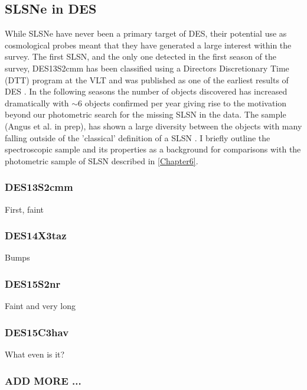 \subsection{SLSNe in DES}
\label{sec:DES_SLSN}
While SLSNe have never been a primary target of DES, their potential use as cosmological probes \citep{Inserra2014} meant that they have generated a large interest within the survey. The first SLSN, and the only one detected in the first season of the survey, DES13S2cmm has been classified using a Directors Discretionary Time (DTT) program at the VLT and was published as one of the earliest results of DES \cite{Papadopoulos2015}. In the following seasons the number of objects discovered has increased dramatically with $\sim$6 objects confirmed per year giving rise to the motivation beyond our photometric search for the missing SLSN in the data. The sample (Angus et al. in prep), has shown a large diversity between the objects with many falling outside of the 'classical' definition of a SLSN \citep{Inserra2018}. I briefly outline the spectroscopic sample and its properties as a background for comparisons with the photometric sample of SLSN described in \cref{Chapter6}.   

\subsubsection{DES13S2cmm}
First, faint

\subsubsection{DES14X3taz}
Bumps

\subsubsection{DES15S2nr}
Faint and very long

\subsubsection{DES15C3hav}
What even is it?

\subsubsection{ADD MORE ... }

